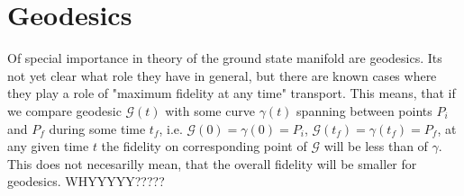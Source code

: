 \chapter{Geodesics}
Of special importance in theory of the ground state manifold are geodesics. Its not yet clear what role they have in general, but there are known cases where they play a role of "maximum fidelity at any time" transport. This means, that if we compare geodesic $\mathcal{G}(t)$ with some curve $\gamma(t)$ spanning between points $P_i$ and $P_f$ during some time $t_f$, i.e. $\mathcal{G}(0)=\gamma(0)=P_i$, $\mathcal{G}(t_f)=\gamma(t_f)=P_f$, at any given time $t$ the fidelity on corresponding point of $\mathcal{G}$ will be less than of $\gamma$. This does not necesarilly mean, that the overall fidelity will be smaller for geodesics. WHYYYYY?????